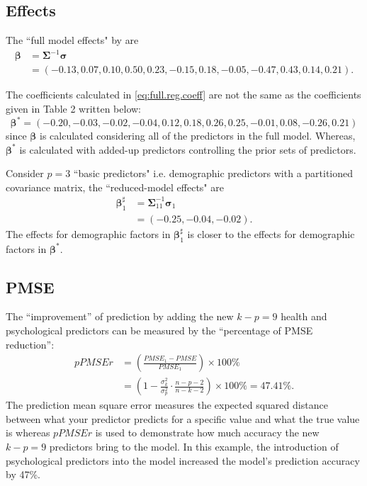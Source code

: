 \documentclass[11pt]{article}
\begin{document}
\subsection{Effects}
The ``full model effects" by \cite{narula1974predictive}are \begin{equation}\begin{aligned}
\label{eq:full.reg.coeff}
\boldsymbol{\beta} &= \boldsymbol{\Sigma}^{-1}\boldsymbol{\sigma} \\
&= (-0.13,  0.07,  0.10,  0.50,  0.23, -0.15,  0.18, -0.05, -0.47,  0.43,  0.14,  0.21). 
\end{aligned}\end{equation}

The coefficients calculated in \eqref{eq:full.reg.coeff} are not the same as the coefficients given in \cite{baker2008chronicpain} Table 2 written below:
$$\boldsymbol{\beta^*} = (-0.20, -0.03, -0.02, -0.04, 0.12, 0.18, 0.26, 0.25, -0.01, 0.08, -0.26, 0.21)$$
since $ \boldsymbol{\beta}$ is calculated considering all of the predictors in the full model. Whereas, $\boldsymbol{\beta^*}$ is calculated with added-up predictors controlling the prior sets of predictors.

Consider $p=3$ ``basic predictors" i.e. demographic predictors with a partitioned covariance matrix, the ``reduced-model effects" are 
\begin{equation}\begin{aligned}
\label{eq:redu.reg.coeff}
\boldsymbol{\beta}_1^\sharp &= \boldsymbol{\Sigma}_{11}^{-1}\boldsymbol{\sigma}_1\\
&=(-0.25 , -0.04,  -0.02).
\end{aligned}\end{equation}
The effects for demographic factors in $\boldsymbol{\beta}_1^\sharp$ is closer to the effects for demographic factors in $\boldsymbol{\beta^*}$.


\subsection{PMSE}
The “improvement” of prediction by adding the new $k-p=9$ health and psychological predictors can be measured by the “percentage of PMSE reduction”:
\begin{equation}\begin{aligned}
\label{eq:pPMSEr}
pPMSEr &= \left(\frac{PMSE_1 - PMSE}{PMSE_1} \right)\times 100\%\\
&= \left(1 - \frac{\sigma_k^2}{\sigma_p^2} \cdot \frac{n-p-2}{n-k-2}\right)\times 100\% = 47.41\%.
\end{aligned}\end{equation}
The prediction mean square error measures the expected squared distance between what your predictor predicts for a specific value and what the true value is whereas $pPMSEr$ is used to demonstrate how much accuracy the new $k-p = 9$ predictors bring to the model. In this example, the introduction of psychological predictors into the model increased the model's prediction accuracy by 47\%.
\end{document}
